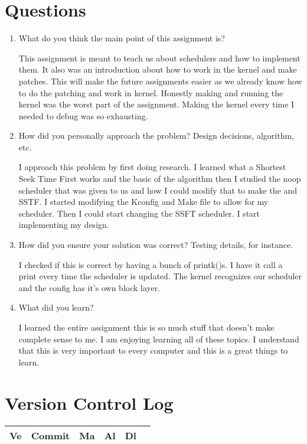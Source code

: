 \documentclass[10pt,journal,compsoc, onecolumn]{IEEEtran}
\begin{document}
\begin{flushleft}

\section{Questions}

\begin{enumerate}

\item What do you think the main point of this assignment is?

This assignment is meant to teach us about schedulers and how to implement them. It also was an introduction about how to work in the kernel and make patches. This will make the future assignments easier as we already know how to do the patching and work in kernel. Honestly making and running the kernel was the worst part of the assignment. Making the kernel every time I needed to debug was so exhausting.

\bigskip
\item How did you personally approach the problem? Design decisions, algorithm, etc.

I approach this problem by first doing research. I learned what a Shortest Seek Time First works and the basic of the algorithm then I studied the noop scheduler that was given to us and how I could modify that to make the and SSTF. I started modifying the Kconfig and Make file to allow for my scheduler. Then I could start changing the SSFT scheduler. I start implementing my design.

\bigskip
\item How did you ensure your solution was correct? Testing details, for instance.

I checked if this is correct by having a bunch of printk()s. I have it call a print every time the scheduler is updated. The kernel recognizes our scheduler and the config has it's own block layer.

\bigskip
\item What did you learn?

I learned the entire assignment this is so much stuff that doesn't make complete sense to me. I am enjoying learning all of these topics. I understand that this is very important to every computer and this is a great things to learn. 

\end{enumerate}

\section{Version Control Log}
\bigskip
\begin{tabular}{  | l | c | c | r | r | r | }
  \hline	
  Ve & Commit				&  Ma & Al & Dl \\
  \hline
  

\end{tabular}
\end{flushleft}
\end{document}
